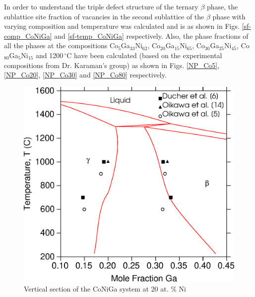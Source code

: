 \documentclass[article]{elsarticle}
\begin{document}
In order to understand the triple defect structure of the ternary $\beta$ phase,
the sublattice site fraction of vacancies in the second sublattice of the $\beta$ phase with varying composition and temperature was calculated and is as shown in Figs. \ref{sf-comp_CoNiGa} and \ref{sf-temp_CoNiGa} respectively.
Also, the phase fractions of all the phases at the compositions Co$_{5}$Ga$_{33}$Ni$_{62}$,
Co$_{20}$Ga$_{15}$Ni$_{65}$, Co$_{30}$Ga$_{25}$Ni$_{45}$,
Co$_{80}$Ga$_{5}$Ni$_{15}$ and 1200$\,^{\circ}\mathrm{C}$ have been calculated
(based on the experimental compositions from Dr. Karaman's group)
as shown in Figs. \ref{NP_Co5}, \ref{NP_Co20}, \ref{NP_Co30} and \ref{NP_Co80} respectively.
\begin{figure}
\centering
\includegraphics[scale=0.45]{CoNiGa_vertical_section}
\caption{Vertical section of the CoNiGa system at 20 at. \% Ni}
\label{vert_20Ni}
\end{figure}
\end{document}
